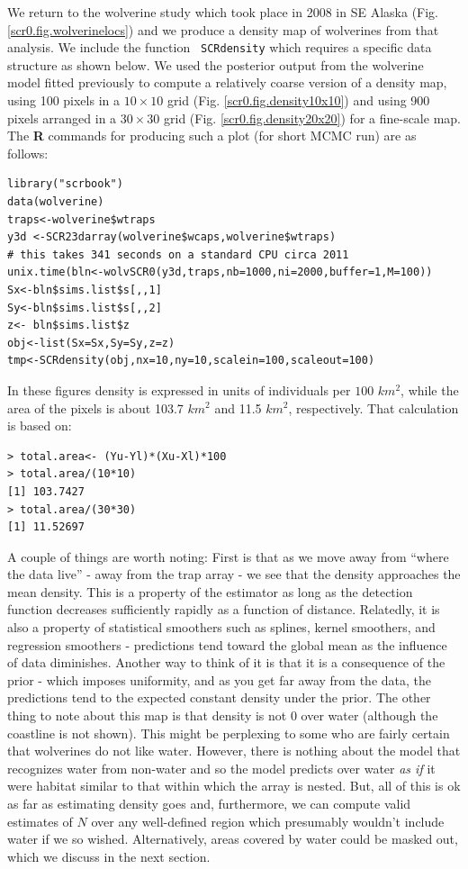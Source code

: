 {We return to the wolverine study which took place in 2008 in SE Alaska
(Fig. \ref{scr0.fig.wolverinelocs}) and we produce a density map of
wolverines from that analysis. We include the function \mbox{\tt
  SCRdensity} which requires a specific data structure as shown
below. 
We used the posterior output from the wolverine model fitted previously
to compute a relatively coarse version of a density map, using 100
pixels in a $10 \times
10$ grid (Fig. \ref{scr0.fig.density10x10}) and using 900 pixels
arranged in
 a $30 \times 30$
grid (Fig. \ref{scr0.fig.density20x20}) for a fine-scale map. The {\bf R} commands for
producing such a plot (for short MCMC run) are as follows:
{\small
\begin{verbatim}
library("scrbook")
data(wolverine)
traps<-wolverine$wtraps
y3d <-SCR23darray(wolverine$wcaps,wolverine$wtraps)
# this takes 341 seconds on a standard CPU circa 2011
unix.time(bln<-wolvSCR0(y3d,traps,nb=1000,ni=2000,buffer=1,M=100))
Sx<-bln$sims.list$s[,,1]
Sy<-bln$sims.list$s[,,2]
z<- bln$sims.list$z
obj<-list(Sx=Sx,Sy=Sy,z=z)
tmp<-SCRdensity(obj,nx=10,ny=10,scalein=100,scaleout=100)
\end{verbatim}
In these figures density is
expressed in units of individuals per $100$ $km^2$, while the area of
the pixels is about 103.7 $km^2$ and 11.5 $km^2$, respectively. That
calculation is based on:
\begin{verbatim}
> total.area<- (Yu-Yl)*(Xu-Xl)*100
> total.area/(10*10)
[1] 103.7427
> total.area/(30*30)
[1] 11.52697
\end{verbatim}

A couple of things are worth noting: First is that as we move away
from ``where the data live'' - away from the trap array - we see that
the density approaches the mean density. This is a property of the
estimator as long as the detection function decreases sufficiently
rapidly as a function of distance.  Relatedly, it is also a property
of statistical smoothers such as splines, kernel smoothers, and
regression smoothers - predictions tend toward the global mean as the
influence of data diminishes. 
 Another way to think of it is that it is
a consequence of the prior - which imposes uniformity, and as you get
far away from the data, the predictions tend to the expected constant
density under the prior.  The other thing to note about this map is
that density is not $0$ over water (although the coastline is not
shown). This might be perplexing to some who are fairly certain that
wolverines do not like water. However, there is nothing about the
model that recognizes water from non-water and so the model predicts
over water {\it as if} it were habitat similar to that within which
the array is nested. But, all of this is ok as far as estimating
density goes and, furthermore, we can compute valid estimates of $N$
over any well-defined region which presumably wouldn't include water
if we so wished. Alternatively, areas covered by water could be masked
out, which we discuss in the next section.

}}
